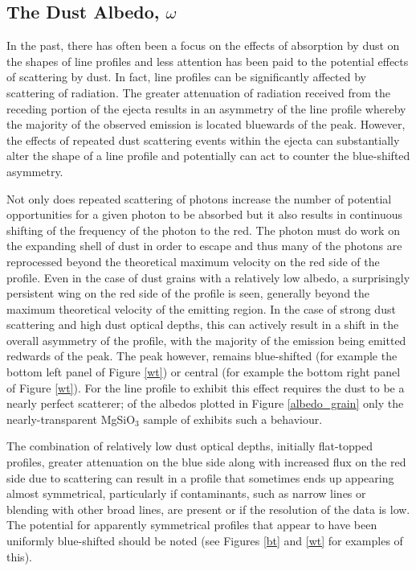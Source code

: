 \subsection{The Dust Albedo, $\omega$}
\label{omega}

In the past, there has often been a focus on the effects of absorption by 
dust on the shapes of line profiles and less attention has been paid to 
the potential effects of scattering by dust.  In fact, line profiles can 
be significantly affected by scattering of radiation.  The greater 
attenuation of radiation received from the receding portion of the ejecta 
results in an asymmetry of the line profile whereby the majority of the 
observed emission is located bluewards of the peak.  However, the effects 
of repeated dust scattering events within the ejecta can substantially 
alter the shape of a line profile and potentially can act to counter the 
blue-shifted asymmetry.

Not only does repeated scattering of photons increase the number of 
potential opportunities for a given photon to be absorbed but it also 
results in continuous shifting of the frequency of the photon to the red.  
The photon must do work on the expanding shell of dust in order to escape 
and thus many of the photons are reprocessed beyond the theoretical 
maximum velocity on the red side of the profile.  Even in the case of dust 
grains with a relatively low albedo, a surprisingly persistent wing on the 
red side of the profile is seen, generally beyond the maximum theoretical 
velocity of the emitting region. In the case of strong dust scattering and 
high dust optical depths, this can actively result in a shift in the 
overall asymmetry of the profile, with the majority of the emission being 
emitted redwards of the peak. The peak however, remains blue-shifted (for 
example the bottom left panel of Figure \ref{wt}) or central (for example 
the bottom right panel of Figure \ref{wt}).  For the line profile to 
exhibit this effect requires the dust to be a nearly perfect scatterer;
of the albedos plotted in Figure \ref{albedo_grain}
only the nearly-transparent MgSiO$_3$ sample of \citet{Jager2003}
exhibits such a behaviour.

The combination of relatively low dust optical depths, initially 
flat-topped profiles, greater attenuation on the blue side along with 
increased flux on the red side due to scattering can result in a profile 
that sometimes ends up appearing almost symmetrical, particularly if 
contaminants, such as narrow lines or blending with other broad lines, are 
present or if the resolution of the data is low.  The potential for 
apparently symmetrical profiles that appear to have been uniformly 
blue-shifted should be noted (see Figures \ref{bt} and \ref{wt} for 
examples of this).


